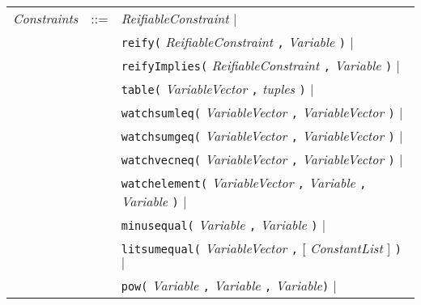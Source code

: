 \documentclass{article}
\begin{document}
\begin{small}
\begin{tabular}{rcl}
\textit{Constraints}  & ::= & \textit{ReifiableConstraint} $\mid$ \\
                      &     & \texttt{reify(} \textit{ReifiableConstraint} \texttt{,} \textit{Variable} \texttt{)} $\mid$ \\
                      &     & \texttt{reifyImplies(} \textit{ReifiableConstraint}  \texttt{,} \textit{Variable} \texttt{)} $\mid$\\
                      &     & \texttt{table(} \textit{VariableVector} \texttt{,} \textit{tuples} \texttt{)} $\mid$ \\        
                      &     & \texttt{watchsumleq(} \textit{VariableVector} \texttt{,} \textit{VariableVector} \texttt{)}  $\mid$\\
                      &     & \texttt{watchsumgeq(} \textit{VariableVector} \texttt{,} \textit{VariableVector} \texttt{)}  $\mid$\\
                      &     & \texttt{watchvecneq(} \textit{VariableVector} \texttt{,} \textit{VariableVector} \texttt{)} $\mid$ \\
                      &     & \texttt{watchelement(} \textit{VariableVector} \texttt{,} \textit{Variable} \texttt{,} \textit{Variable} \texttt{)} $\mid$ \\
                      &     & \texttt{minusequal(} \textit{Variable} \texttt{,} \textit{Variable} \texttt{)}  $\mid$\\
                      &     & \texttt{litsumequal(} \textit{VariableVector} \texttt{,} [ \textit{ConstantList} ] \texttt{)} $\mid$ \\
                      &     & \texttt{pow(} \textit{Variable} \texttt{,} \textit{Variable} \texttt{,} \textit{Variable}\texttt{)} $\mid$ \\



\end{tabular}
\end{small}
\end{document}
